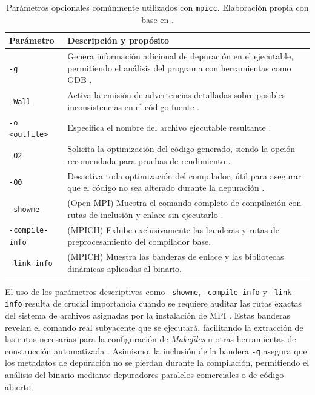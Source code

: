 \begin{table}[h!]
\centering
\renewcommand{\arraystretch}{1.5}
\caption{Parámetros opcionales comúnmente utilizados con \texttt{mpicc}. Elaboración propia con base en \cite{pacheco_2011, open_mpi_2026}.}
\label{tab:mpicc_flags}
\begin{tabular}{|l|p{11cm}|}
\hline
\textbf{Parámetro} & \textbf{Descripción y propósito} \\
\hline
\texttt{-g} & Genera información adicional de depuración en el ejecutable, permitiendo el análisis del programa con herramientas como GDB \cite{pacheco_2011}. \\
\hline
\texttt{-Wall} & Activa la emisión de advertencias detalladas sobre posibles inconsistencias en el código fuente \cite{pacheco_2011}. \\
\hline
\texttt{-o <outfile>} & Especifica el nombre del archivo ejecutable resultante \cite{pacheco_2011}. \\
\hline
\texttt{-O2} & Solicita la optimización del código generado, siendo la opción recomendada para pruebas de rendimiento \cite{pacheco_2011}. \\
\hline
\texttt{-O0} & Desactiva toda optimización del compilador, útil para asegurar que el código no sea alterado durante la depuración \cite{pacheco_2011}. \\
\hline
\texttt{-showme} & (Open MPI) Muestra el comando completo de compilación con rutas de inclusión y enlace sin ejecutarlo \cite{open_mpi_2026}. \\
\hline
\texttt{-compile-info} & (MPICH) Exhibe exclusivamente las banderas y rutas de preprocesamiento del compilador base. \\
\hline
\texttt{-link-info} & (MPICH) Muestra las banderas de enlace y las bibliotecas dinámicas aplicadas al binario. \\
\hline
\end{tabular}
\end{table}


El uso de los parámetros descriptivos como \texttt{-showme}, \texttt{-compile-info} y \texttt{-link-info} resulta de crucial importancia cuando se requiere auditar las rutas exactas del sistema de archivos asignadas por la instalación de MPI \cite{open_mpi_2026}. Estas banderas revelan el comando real subyacente que se ejecutará, facilitando la extracción de las rutas necesarias para la configuración de \textit{Makefiles} u otras herramientas de construcción automatizada \cite{gropp_using_mpi_1999}. Asimismo, la inclusión de la bandera \texttt{-g} asegura que los metadatos de depuración no se pierdan durante la compilación, permitiendo el análisis del binario mediante depuradores paralelos comerciales o de código abierto.

